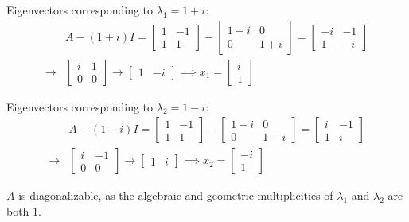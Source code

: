 \documentclass{article}
\begin{document}
Eigenvectors corresponding to $\lambda_1=1+i$:
\begin{align*}
	&A-(1+i)I 
	= \begin{bmatrix}
		1 & -1 \\
		1 & 1
	\end{bmatrix}
	- \begin{bmatrix}
		1+i & 0 \\
		0 & 1+i
	\end{bmatrix}
	=\begin{bmatrix}
		-i & -1 \\
		1 & -i
	\end{bmatrix} \\
	\rightarrow{}& \begin{bmatrix}
		i & 1 \\ 
		0 & 0
	\end{bmatrix}
	\rightarrow \begin{bmatrix}
		1 & -i
	\end{bmatrix}
	\implies x_1= \begin{bmatrix}
	    i \\ 1
	\end{bmatrix}
\end{align*}

Eigenvectors corresponding to $\lambda_2=1-i$:
\begin{align*}
	&A-(1-i)I 
	= \begin{bmatrix}
		1 & -1 \\
		1 & 1
	\end{bmatrix}
	- \begin{bmatrix}
		1-i & 0 \\
		0 & 1-i
	\end{bmatrix}
	=\begin{bmatrix}
		i & -1 \\
		1 & i
	\end{bmatrix} \\
	\rightarrow{}& \begin{bmatrix}
		i & -1 \\ 
		0 & 0
	\end{bmatrix}
	\rightarrow \begin{bmatrix}
		1 & i
	\end{bmatrix}
	\implies x_2= \begin{bmatrix}
	    -i \\ 1
	\end{bmatrix}
\end{align*}

$A$ is diagonalizable, as the algebraic and geometric multiplicities of $\lambda_1$ and $\lambda_2$ are both $1$.
\end{document}
